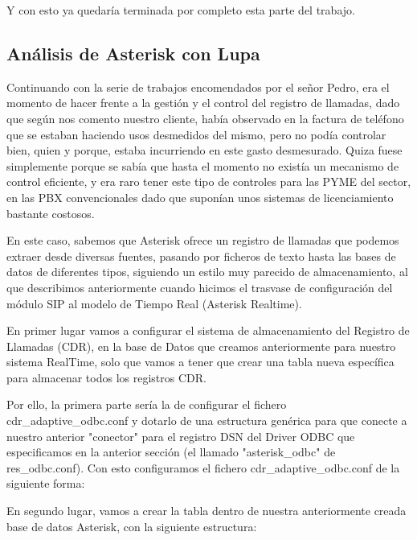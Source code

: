 Y con esto ya quedaría terminada por completo esta parte del trabajo.

\newpage

\subsection{Análisis de Asterisk con Lupa}

Continuando con la serie de trabajos encomendados por el señor Pedro, era el momento de hacer frente a la gestión y el control del registro de llamadas, dado que según nos comento nuestro cliente, había observado en la factura de teléfono que se estaban haciendo usos desmedidos del mismo, pero no podía controlar bien, quien y porque, estaba incurriendo en este gasto desmesurado. Quiza fuese simplemente porque se sabía que hasta el momento no existía un mecanismo de control eficiente, y era raro tener este tipo de controles para las PYME del sector, en las PBX convencionales dado que suponían unos sistemas de licenciamiento bastante costosos.

En este caso, sabemos que Asterisk ofrece un registro de llamadas que podemos extraer desde diversas fuentes, pasando por ficheros de texto hasta las bases de datos de diferentes tipos, siguiendo un estilo muy parecido de almacenamiento, al que describimos anteriormente cuando hicimos el trasvase de configuración del módulo SIP al modelo de Tiempo Real (Asterisk Realtime).

En primer lugar vamos a configurar el sistema de almacenamiento del Registro de Llamadas (CDR), en la base de Datos que creamos anteriormente para nuestro sistema RealTime, solo que vamos a tener que crear una tabla nueva específica para almacenar todos los registros CDR.

Por ello, la primera parte sería la de configurar el fichero cdr\_adaptive\_odbc.conf y dotarlo de una estructura genérica para que conecte a nuestro anterior "conector" para el registro DSN del Driver ODBC que especificamos en la anterior sección (el llamado "asterisk\_odbc" de res\_odbc.conf). Con esto configuramos el fichero cdr\_adaptive\_odbc.conf de la siguiente forma:



En segundo lugar, vamos a crear la tabla dentro de nuestra anteriormente creada base de datos Asterisk, con la siguiente estructura:



